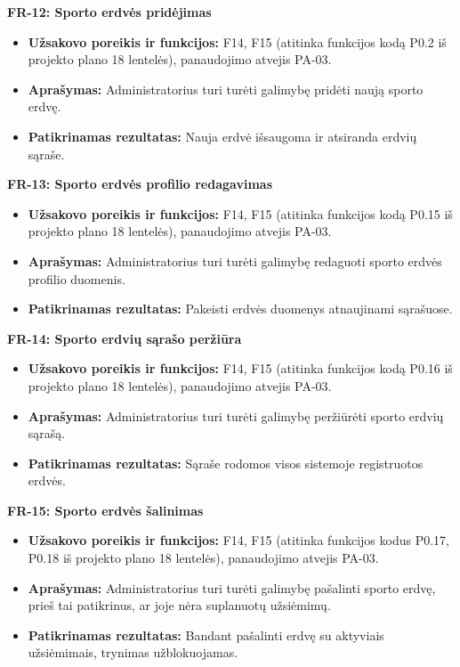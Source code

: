 \vspace{0.3cm}
\noindent\textbf{FR-12: Sporto erdvės pridėjimas}
\begin{itemize}
    \item \textbf{Užsakovo poreikis ir funkcijos:} F14, F15 (atitinka funkcijos kodą P0.2 iš projekto plano 18 lentelės), panaudojimo atvejis PA-03.
    \item \textbf{Aprašymas:} Administratorius turi turėti galimybę pridėti naują sporto erdvę.
    \item \textbf{Patikrinamas rezultatas:} Nauja erdvė išsaugoma ir atsiranda erdvių sąraše.
\end{itemize}

\vspace{0.3cm}
\noindent\textbf{FR-13: Sporto erdvės profilio redagavimas}
\begin{itemize}
    \item \textbf{Užsakovo poreikis ir funkcijos:} F14, F15 (atitinka funkcijos kodą P0.15 iš projekto plano 18 lentelės), panaudojimo atvejis PA-03.
    \item \textbf{Aprašymas:} Administratorius turi turėti galimybę redaguoti sporto erdvės profilio duomenis.
    \item \textbf{Patikrinamas rezultatas:} Pakeisti erdvės duomenys atnaujinami sąrašuose.
\end{itemize}

\vspace{0.3cm}
\noindent\textbf{FR-14: Sporto erdvių sąrašo peržiūra}
\begin{itemize}
    \item \textbf{Užsakovo poreikis ir funkcijos:} F14, F15 (atitinka funkcijos kodą P0.16 iš projekto plano 18 lentelės), panaudojimo atvejis PA-03.
    \item \textbf{Aprašymas:} Administratorius turi turėti galimybę peržiūrėti sporto erdvių sąrašą.
    \item \textbf{Patikrinamas rezultatas:} Sąraše rodomos visos sistemoje registruotos erdvės.
\end{itemize}

\vspace{0.3cm}
\noindent\textbf{FR-15: Sporto erdvės šalinimas}
\begin{itemize}
    \item \textbf{Užsakovo poreikis ir funkcijos:} F14, F15 (atitinka funkcijos kodus P0.17, P0.18 iš projekto plano 18 lentelės), panaudojimo atvejis PA-03.
    \item \textbf{Aprašymas:} Administratorius turi turėti galimybę pašalinti sporto erdvę, prieš tai patikrinus, ar joje nėra suplanuotų užsiėmimų.
    \item \textbf{Patikrinamas rezultatas:} Bandant pašalinti erdvę su aktyviais užsiėmimais, trynimas užblokuojamas.
\end{itemize}

